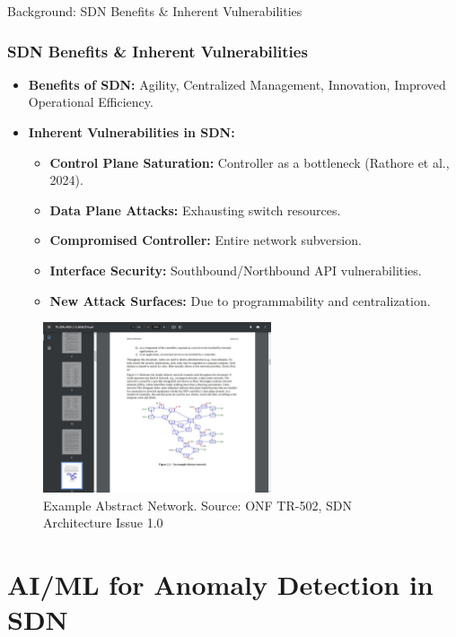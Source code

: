 \documentclass{beamer}
\begin{document}
\begin{frame}{Background: SDN Benefits \& Inherent Vulnerabilities}
  \frametitle{SDN Benefits \& Inherent Vulnerabilities}
  \begin{itemize}
    \item \textbf{Benefits of SDN:} Agility, Centralized Management, Innovation, Improved Operational Efficiency.
    \item \textbf{Inherent Vulnerabilities in SDN:}
    \begin{itemize}
        \item \textbf{Control Plane Saturation:} Controller as a bottleneck (Rathore et al., 2024).
        \item \textbf{Data Plane Attacks:} Exhausting switch resources.
        \item \textbf{Compromised Controller:} Entire network subversion.
        \item \textbf{Interface Security:} Southbound/Northbound API vulnerabilities.
        \item \textbf{New Attack Surfaces:} Due to programmability and centralization.
    \end{itemize}
  \end{itemize}
  \begin{figure}
    \centering
    \includegraphics[width=0.6\textwidth]{figures/onf_sdn_figure_2_1_abstract_network.png}
    \caption{Example Abstract Network. Source: ONF TR-502, SDN Architecture Issue 1.0}
  \end{figure}
\end{frame}

\section{AI/ML for Anomaly Detection in SDN}
\end{document}
